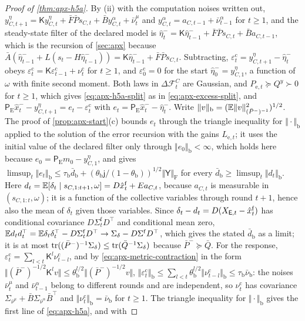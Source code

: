 \begin{proof}[Proof of \cref{thm:apx-h5a}]
By (ii) with the computation noises written out, $y^\eta_{C,t+1}=\mathsf Ky^\eta_{C,t}+\bar F\bar Ps_{C,t}+\bar By^\alpha_{C,t}+\bar\nu^\mu_t$ and $y^\alpha_{C,t}=a_{C,t-1}+\bar\nu^\alpha_{t-1}$ for $t\ge1$, and the steady-state filter of the declared model is $\hat\eta^-_t=\mathsf K\hat\eta^-_{t-1}+\bar F\bar Ps_{C,t}+\bar Ba_{C,t-1}$, which is the recursion of \cref{sec:apx} because $\bar A(\hat\eta^-_{t-1}+L(s_t-H\hat\eta^-_{t-1}))=\mathsf K\hat\eta^-_{t-1}+\bar F\bar Ps_{C,t}$. Subtracting, $\varepsilon^{\mathrm c}_t=y^\eta_{C,t+1}-\hat\eta^-_t$ obeys $\varepsilon^{\mathrm c}_t=\mathsf K\varepsilon^{\mathrm c}_{t-1}+\nu^{\mathrm c}_t$ for $t\ge1$, and $\varepsilon^{\mathrm c}_0=0$ for the start $\hat\eta^-_0=y^\eta_{C,1}$, a function of $\omega$ with finite second moment. Both laws in $\Delta\mathcal F^C_t$ are Gaussian, and $P_{\mathrm e,t}\succeq Q^y\succ0$ for $t\ge1$, which gives \eqref{eq:apx-h5a-split} as in \cref{eq:apx-excess-split}, and $\mathsf P_{\mathrm E}\hat x^-_t-y^\eta_{C,t+1}=e_t-\varepsilon^{\mathrm c}_t$ with $e_t=\mathsf P_{\mathrm E}\hat x^-_t-\hat\eta^-_t$. Write $\Vert v\Vert_{\mathrm b}=(\mathbb{E}\Vert v\Vert^2_{(\bar P^-)^{-1}})^{1/2}$. The proof of \cref{prop:apx-start}(c) bounds $e_t$ through the triangle inequality for $\Vert\cdot\Vert_{\mathrm b}$ applied to the solution of the error recursion with the gains $L_{\mathrm e,t}$; it uses the initial value of the declared filter only through $\Vert e_0\Vert_{\mathrm b}<\infty$, which holds here because $e_0=\mathsf P_{\mathrm E}m_0-y^\eta_{C,1}$, and gives $\limsup_t\Vert e_t\Vert_{\mathrm b}\le\tau_{\mathrm b}\bar d_{\mathrm b}+(\theta_{\mathrm b}\mathsf j/(1-\theta_{\mathrm b}))^{1/2}\Vert\mathsf Y\Vert_{\mathrm F}$ for every $\bar d_{\mathrm b}\ge\limsup_t\Vert d_t\Vert_{\mathrm b}$. Here $d_t=\mathbb{E}[\delta_t\mid s_{C,1:t+1},\omega]=D\hat x^{\mathrm f}_t+Ea_{C,t}$, because $a_{C,t}$ is measurable in $(s_{C,1:t},\omega)$; it is a function of the collective variables through round $t+1$, hence also the mean of $\delta_t$ given those variables. Since $\delta_t-d_t=D(X_{\mathsf{E},t}-\hat x^{\mathrm f}_t)$ has conditional covariance $D\Sigma^{\mathrm f}_tD^\top$ and conditional mean zero, $\mathbb{E} d_td_t^\top=\mathbb{E}\delta_t\delta_t^\top-D\Sigma^{\mathrm f}_tD^\top\to\Sigma_\delta-D\Sigma^{\mathrm f}D^\top$, which gives the stated $\bar d_{\mathrm b}$ as a limit; it is at most $\operatorname{tr}((\bar P^-)^{-1}\Sigma_\delta)\le\operatorname{tr}(\bar Q^{-1}\Sigma_\delta)$ because $\bar P^-\succeq\bar Q$. For the response, $\varepsilon^{\mathrm c}_t=\sum_{l<t}\mathsf K^l\nu^{\mathrm c}_{t-l}$, and by \cref{eq:apx-metric-contraction} in the form $\Vert(\bar P^-)^{-1/2}\mathsf K^lv\Vert\le\theta_{\mathrm b}^{l/2}\Vert(\bar P^-)^{-1/2}v\Vert$, $\Vert\varepsilon^{\mathrm c}_t\Vert_{\mathrm b}\le\sum_{l<t}\theta_{\mathrm b}^{l/2}\Vert\nu^{\mathrm c}_{t-l}\Vert_{\mathrm b}\le\tau_{\mathrm b}\bar\nu_{\mathrm b}$: the noises $\bar\nu^\mu_t$ and $\bar\nu^\alpha_{t-1}$ belong to different rounds and are independent, so $\nu^{\mathrm c}_t$ has covariance $\Sigma_{\bar\nu^\mu}+\bar B\Sigma_{\bar\nu^\alpha}\bar B^\top$ and $\Vert\nu^{\mathrm c}_t\Vert_{\mathrm b}=\bar\nu_{\mathrm b}$ for $t\ge1$. The triangle inequality for $\Vert\cdot\Vert_{\mathrm b}$ gives the first line of \eqref{eq:apx-h5a}, and with 
\end{proof}
